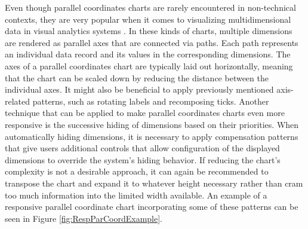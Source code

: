 Even though parallel coordinates charts are rarely encountered in non-technical contexts, they are very popular when it comes to visualizing multidimensional data in visual analytics systems \parencite{HighD}. In these kinds of charts, multiple dimensions are rendered as parallel axes that are connected via paths. Each path represents an individual data record and its values in the corresponding dimensions. The axes of a parallel coordinates chart are typically laid out horizontally, meaning that the chart can be scaled down by reducing the distance between the individual axes. It might also be beneficial to apply previously mentioned axis-related patterns, such as rotating labels and recomposing ticks. Another technique that can be applied to make parallel coordinates charts even more responsive is the successive hiding of dimensions based on their priorities. When automatically hiding dimensions, it is necessary to apply compensation patterns that give users additional controls that allow configuration of the displayed dimensions to override the system's hiding behavior. If reducing the chart's complexity is not a desirable approach, it can again be recommended to transpose the chart and expand it to whatever height necessary rather than cram too much information into the limited width available. An example of a responsive parallel coordinate chart incorporating some of these patterns can be seen in Figure \ref{fig:RespParCoordExample}.

